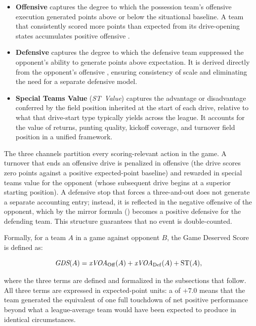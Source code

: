 \begin{itemize}
  \item \textbf{Offensive \xvoa{}} captures the degree to which the possession
        team's offensive execution generated points above or below the
        situational baseline. A team that consistently scored more points than
        expected from its drive-opening states accumulates positive offensive
        \xvoa{}.

  \item \textbf{Defensive \xvoa{}} captures the degree to which the defensive
        team suppressed the opponent's ability to generate points above
        expectation. It is derived directly from the opponent's offensive
        \xvoa{}, ensuring consistency of scale and eliminating the need for a
        separate defensive model.

  \item \textbf{Special Teams Value} (\textit{ST~Value}) captures the advantage
        or disadvantage conferred by the field position inherited at the start
        of each drive, relative to what that drive-start type typically yields
        across the league. It accounts for the value of returns, punting
        quality, kickoff coverage, and turnover field position in a unified
        framework.
\end{itemize}

The three channels partition every scoring-relevant action in the game. A
turnover that ends an offensive drive is penalized in offensive \xvoa{} (the
drive scores zero points against a positive expected-point baseline) and
rewarded in special teams value for the opponent (whose subsequent drive begins
at a superior starting position). A defensive stop that forces a three-and-out does not generate a
separate accounting entry; instead, it is reflected in the negative offensive
\xvoa{} of the opponent, which by the mirror formula ()
becomes a positive defensive \xvoa{} for the defending team. This structure
guarantees that no event is double-counted.

Formally, for a team $A$ in a game against opponent $B$, the Game Deserved
Score is defined as:

\begin{equation}
  \label{eq:gds}
  \textit{GDS}(A) = \textit{xVOA}{}_{\mathrm{Off}}(A) + \textit{xVOA}{}_{\mathrm{Def}}(A)
             + \mathrm{ST}(A),
\end{equation}

where the three terms are defined and formalized in the subsections that
follow. All three terms are expressed in expected-point units: a
\gds{} of $+7.0$ means that the team generated the equivalent of one full
touchdown of net positive performance beyond what a league-average team
would have been expected to produce in identical circumstances.

